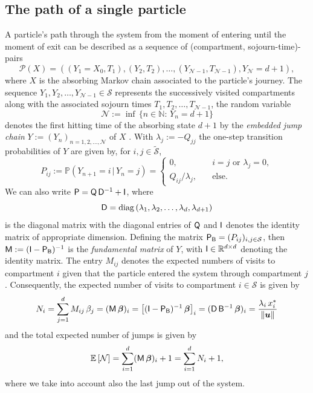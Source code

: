 \documentclass[smallextended]{svjour3}
\newcommand{\R}{\mathbb{R}}
\newcommand{\N}{\mathbb{N}}
\renewcommand{\P}{\mathbb{P}}
\newcommand{\E}{\mathbb{E}}
\newcommand{\suml}{\sum\limits}
\newcommand{\vnorms}[1]{\|#1\|}
\newcommand{\diag}{\operatorname{diag}}
\begin{document}
\subsection{The path of a single particle}
A particle's path through the system from the moment of entering until the moment of exit can be described as a sequence of (compartment, sojourn-time)-pairs
\begin{equation}
  \label{eqn:path}
  \mathcal{P}(X) = ((Y_1=X_0, T_1),(Y_2,T_2),\ldots,(Y_{\mathcal{N}-1},T_{\mathcal{N}-1}), Y_{\mathcal{N}}=d+1),
\end{equation}
where $X$ is the absorbing Markov chain associated to the particle's journey.
The sequence $Y_1,Y_2,\ldots,Y_{\mathcal{N}-1}\in\mathcal{S}$ represents the successively visited compartments along with the associated sojourn times $T_1,T_2,\ldots,T_{\mathcal{N}-1}$, the random variable
\begin{equation*}
  \mathcal{N}:=\inf\,\{n\in\N:\,Y_n=d+1\}
\end{equation*}
denotes the first hitting time of the absorbing state $d+1$ by the \emph{embedded jump chain} $Y:=(Y_n)_{n=1,2,\ldots,\mathcal{N}}$ of $X$ \citep{Norris1997}.
With $\lambda_j:=-Q_{jj}$ the one-step transition probabilities of $Y$ are given by, for $i,j\in\widetilde{\mathcal{S}}$,
\begin{equation}\label{eqn:P_ij}
  P_{ij}:=\P(Y_{n+1}=i\,|\,Y_n=j) = 
  \begin{cases}
    0,\quad & i=j\text{ or }\lambda_j=0,\\
    Q_{ij}/\lambda_j,\quad & \text{else}.
  \end{cases}
\end{equation}
We can also write $\mathsf{P}=\mathsf{Q}\,\mathsf{D}^{-1} + \mathsf{I}$, where
\begin{equation*}
  \tens{D} = \diag\,(\lambda_1,\lambda_2,\ldots,\lambda_d,\lambda_{d+1})
\end{equation*}
is the diagonal matrix with the diagonal entries of $\mathsf{Q}$ and $\mathsf{I}$ denotes the identity matrix of appropriate dimension.
Defining the matrix $\mathsf{P}_{\mathsf{B}} = (P_{ij})_{i,j\in\mathcal{S}}$, then $\mathsf{M}:=(\mathsf{I}-\mathsf{P}_{\mathsf{B}})^{-1}$ is the \emph{fundamental matrix} of $Y$, with $\tens{I}\in\R^{d\times d}$ denoting the identity matrix.
The entry $M_{ij}$ denotes the expected numbers of visits to compartment $i$ given that the particle entered the system through compartment $j$.
Consequently, the expected number of visits to compartment $i\in\mathcal{S}$ is given by 
\begin{equation}
  \label{eqn:N_i}
  N_i = \suml_{j=1}^d M_{ij}\,\beta_j = (\tens{M}\,\vec{\beta})_i = \left[(\tens{I}-\tens{P}_{\tens{B}})^{-1}\,\vec{\beta}\right]_i 
  = (\tens{D}\,\tens{B}^{-1}\,\vec{\beta})_i
  = \frac{\lambda_i\,x^\ast_i}{\vnorms{\vec{u}}}
\end{equation}
and the total expected number of jumps is given by
\begin{equation*}
  \E\left[\mathcal{N}\right] = \suml_{i=1}^d (\tens{M}\,\vec{\beta})_i+1= \suml_{i=1}^d N_i+1,
\end{equation*}
where we take into account also the last jump out of the system.
\end{document}
